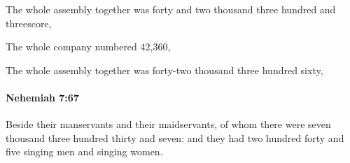 			\begin{versebox}
					\item[BHS] 
					\item[LXX] 
					\item[ASV] The whole assembly together was forty and two thousand three hundred and threescore,
					\item[NIV] The whole company numbered 42,360,
					\item[NRSV] The whole assembly together was forty-two thousand three hundred sixty,
			\end{versebox}

		\paragraph{Nehemiah 7:67} %
			\label{NEHEMIAH-7-67}

			Beside their manservants and their maidservants, of whom there were seven thousand three hundred thirty and seven: and they had two hundred forty and five singing men and singing women.

